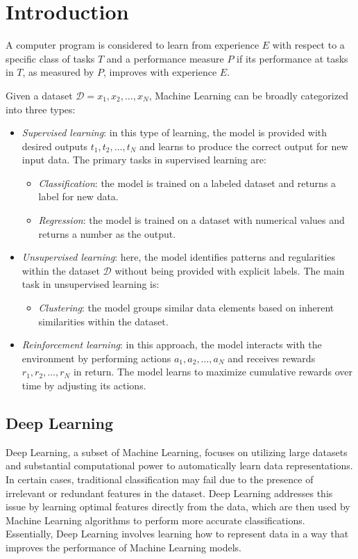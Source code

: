 \section{Introduction}

\begin{definition}
    A computer program is considered to learn from experience $E$ with respect to a specific class of tasks $T$ and a performance measure $P$ if its performance at tasks in $T$, as measured by $P$, improves with experience $E$.
\end{definition}
Given a dataset $\mathcal{D} = {x_1, x_2, \dots, x_N}$, Machine Learning can be broadly categorized into three types:
\begin{itemize} 
    \item \textit{Supervised learning}: in this type of learning, the model is provided with desired outputs ${t_1, t_2, \dots, t_N}$ and learns to produce the correct output for new input data. 
        The primary tasks in supervised learning are: 
        \begin{itemize} 
            \item \textit{Classification}: the model is trained on a labeled dataset and returns a label for new data. 
            \item \textit{Regression}: the model is trained on a dataset with numerical values and returns a number as the output. 
        \end{itemize} 
    \item \textit{Unsupervised learning}: here, the model identifies patterns and regularities within the dataset $\mathcal{D}$ without being provided with explicit labels. 
        The main task in unsupervised learning is: 
        \begin{itemize} 
            \item \textit{Clustering}: the model groups similar data elements based on inherent similarities within the dataset. 
        \end{itemize} 
    \item \textit{Reinforcement learning}: in this approach, the model interacts with the environment by performing actions ${a_1, a_2, \dots, a_N}$ and receives rewards ${r_1, r_2, \dots, r_N}$ in return. 
        The model learns to maximize cumulative rewards over time by adjusting its actions. 
\end{itemize}

\subsection{Deep Learning}
Deep Learning, a subset of Machine Learning, focuses on utilizing large datasets and substantial computational power to automatically learn data representations. 
In certain cases, traditional classification may fail due to the presence of irrelevant or redundant features in the dataset. 
Deep Learning addresses this issue by learning optimal features directly from the data, which are then used by Machine Learning algorithms to perform more accurate classifications. 
Essentially, Deep Learning involves learning how to represent data in a way that improves the performance of Machine Learning models.